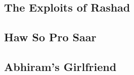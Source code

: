 \subsection{The Exploits of Rashad}

\subsection{Haw So Pro Saar}

\subsection{Abhiram's Girlfriend}
